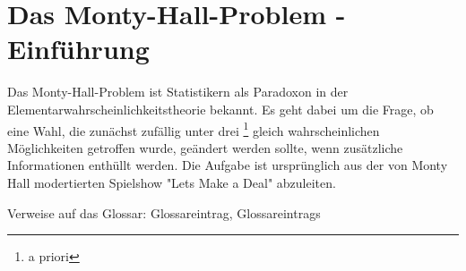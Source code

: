 
\chapter{Das Monty-Hall-Problem - Einführung}

Das Monty-Hall-Problem ist Statistikern als Paradoxon in der Elementarwahrscheinlichkeitstheorie bekannt. Es geht dabei um die Frage, ob eine Wahl, die zunächst 
zufällig unter drei \footnote[1]{a priori} gleich wahrscheinlichen Möglichkeiten getroffen wurde, geändert werden sollte, wenn zusätzliche Informationen enthüllt werden.
Die Aufgabe ist ursprünglich aus der von Monty Hall modertierten Spielshow "Lets Make a Deal" abzuleiten.










Verweise auf das Glossar: \gls{Glossareintrag}, \glspl{Glossareintrag}

